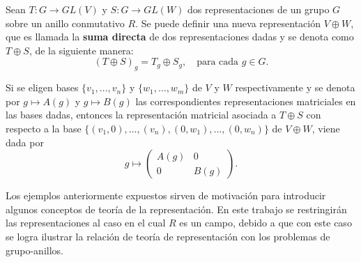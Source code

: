 \begin{ejemplo}
Sean $T \colon G \to GL(V)$ y $S \colon G \to GL(W)$ dos representaciones de un grupo $G$ sobre un anillo conmutativo $R$. Se puede definir una nueva representación $V \oplus W$, que es llamada la \textbf{suma directa} de dos representaciones dadas y se denota como $T \oplus S$, de la siguiente manera: \begin{equation*} (T \oplus S)_g = T_g \oplus S_g, \quad \mbox{para cada } g \in G. \end{equation*}

Si se eligen bases $\{v_1, \dots, v_n\}$ y $\{ w_1, \dots, w_m \}$ de $V$ y $W$ respectivamente y se denota por $g \mapsto A(g)$ y $g \mapsto B(g)$ las correspondientes representaciones matriciales en las bases dadas, entonces la representación matricial asociada a $T \oplus S$ con respecto a la base $\{ (v_1,0), \dots , (v_n), (0,w_1), \dots, (0,w_n)  \}$ de $V \oplus W$, viene dada por
\begin{equation*} g \mapsto \begin{pmatrix}
A(g) & 0 \\
0 & B(g)
\end{pmatrix}. \end{equation*}
\end{ejemplo}
Los ejemplos anteriormente expuestos sirven de motivación para introducir algunos conceptos de teoría de la representación. En este trabajo se restringirán las representaciones al caso en el cual $R$ es un campo, debido a que con este caso se logra ilustrar la relación de teoría de representación con los problemas de grupo-anillos.

